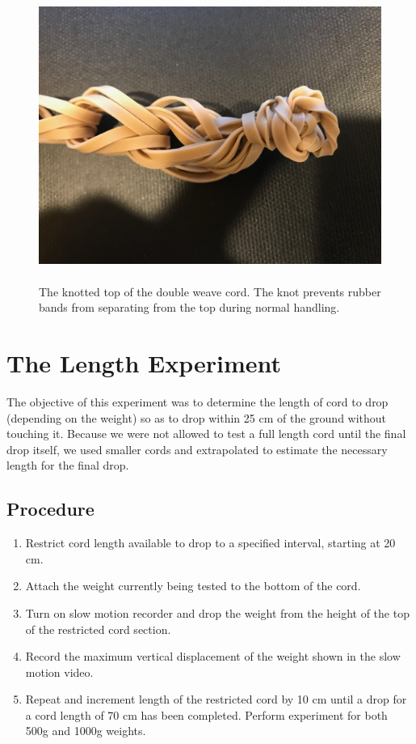 \documentclass[12pt]{article}
\begin{document}
\begin{figure}
    \centering
    \includegraphics[width=16cm,height=9.5cm]{knotteddoubleweave}
    \caption{The knotted top of the double weave cord. The knot prevents rubber bands from separating from the top during normal handling.}
    \label{fig:knottedDoubleWeave}
\end{figure}

\section {The Length Experiment}
\label{sec:lengthExperiment}

The objective of this experiment was to determine the length of cord to drop (depending on the weight) so as to drop within 25 cm of the ground without touching it. Because we were not allowed to test a full length cord until the final drop itself, we used smaller cords and extrapolated to estimate the necessary length for the final drop.

\subsection{Procedure}

\begin{enumerate}
    \item Restrict cord length available to drop to a specified interval, starting at 20 cm.
    \item Attach the weight currently being tested to the bottom of the cord.
    \item Turn on slow motion recorder and drop the weight from the height of the top of the restricted cord section.
    \item Record the maximum vertical displacement of the weight shown in the slow motion video.
    \item Repeat and increment length of the restricted cord by 10 cm until a drop for a cord length of 70 cm has been completed. Perform experiment for both 500g and 1000g weights.
\end{enumerate}
\end{document}
